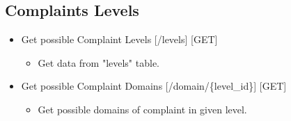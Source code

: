 \documentclass[12pt]{article}
\begin{document}
\subsection{Complaints Levels}
\begin{itemize}
\setlength\itemsep{-0.4em}
\item Get possible Complaint Levels [/levels] [GET]
\begin{itemize}
\setlength\itemsep{-0.4em}
\item Get data from "levels" table.
\end{itemize}
\item Get possible Complaint Domains [/domain/\{level\_id\}] [GET]
\begin{itemize}
\setlength\itemsep{-0.4em}
\item Get possible domains of complaint in given level.
\end{itemize}
\end{itemize}
\end{document}
